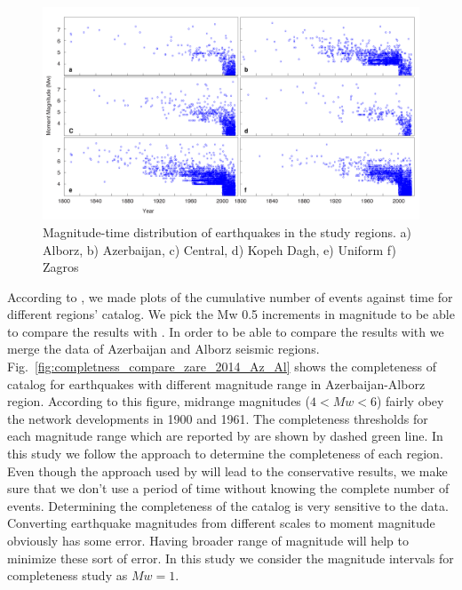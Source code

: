 \begin{figure} [!ht]
\centering
\includegraphics[scale=0.5]{figures/pdf/figure-05.pdf} 
\caption{Magnitude-time distribution of earthquakes in the study regions. a) Alborz, b) Azerbaijan, c) Central, d) Kopeh Dagh, e) Uniform f) Zagros}
\label{fig:completness_scatter}
\end{figure}

According to   \citet{Frankel1995},  we made plots of the cumulative number of events against time for different regions' catalog. We pick the Mw 0.5 increments in magnitude to be able to compare the results with \citet{Zare2014}. In order to be able to compare the results with \citet{Zare2014} we merge the data of Azerbaijan and Alborz seismic regions.  Fig.~\ref{fig:completness_compare_zare_2014_Az_Al} shows the completeness of catalog for earthquakes with different magnitude range in Azerbaijan-Alborz region. According to this figure, midrange magnitudes ($ 4 < Mw < 6 $) fairly obey the network developments in 1900 and 1961. The completeness thresholds for each magnitude range which are reported by \citet{Zare2014} are shown by dashed green line. In this study we follow the \citet{Frankel1995} approach to determine the completeness of each region. Even though the approach used by \citet{Frankel1995} will lead to the conservative results, we make sure that we don't use a period of time without knowing the complete number of events. Determining the completeness of the catalog is very sensitive to the data. Converting earthquake magnitudes from different scales to moment magnitude obviously has some error. Having broader range of magnitude will help to minimize these sort of error. In this study we consider the magnitude intervals for completeness study as $Mw = 1$. 

